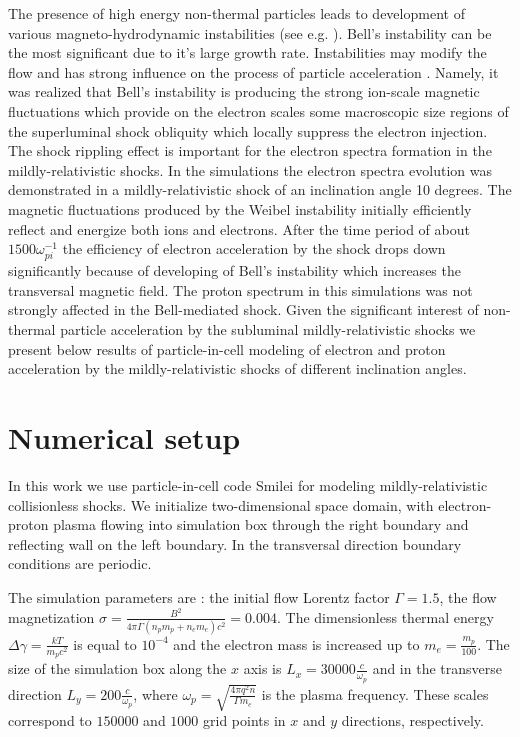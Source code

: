 \documentclass[a4paper]{jpconf}
\begin{document}
	The presence of high energy non-thermal particles leads to development of various magneto-hydrodynamic instabilities (see e.g. \cite{MD2001,Amato09,Bykov2013}). Bell's instability \cite{Bell04} can be the most significant due to it's large growth rate. Instabilities may modify the flow and has strong influence on the process of particle acceleration \cite{Crumley2019,2021MNRAS.501.4837L,2021MNRAS.502.5065L}. Namely, it was realized that Bell's instability is producing the strong ion-scale magnetic fluctuations which 
	provide on the electron scales some macroscopic size regions of the superluminal shock obliquity which locally suppress the electron injection. The shock rippling effect is important for the electron spectra formation in the mildly-relativistic shocks.
	In the simulations \cite{Crumley2019} the electron spectra evolution was demonstrated in a mildly-relativistic shock   of an inclination angle 10 degrees. The magnetic fluctuations produced by the Weibel instability initially efficiently reflect and energize both ions and electrons. After the time period of about $1500 \omega_{pi}^{-1}$  the efficiency of electron acceleration by the shock drops down significantly because of developing of Bell's instability which increases the transversal magnetic field. The proton spectrum in this simulations was not strongly affected in the Bell-mediated shock.   Given the significant interest of non-thermal particle acceleration by the subluminal mildly-relativistic shocks we present below results of particle-in-cell modeling of electron and proton acceleration by the mildly-relativistic shocks of different inclination angles. 
	
	
	\section{Numerical setup}
	In this work we use particle-in-cell code Smilei \cite{Smilei18} for modeling mildly-relativistic collisionless shocks. We initialize two-dimensional space domain, with electron-proton plasma flowing into simulation box through the right boundary and reflecting wall on the left boundary. In the transversal direction boundary conditions are periodic.
	
	The simulation parameters are : the initial flow Lorentz factor $\Gamma = 1.5$, the flow magnetization $\sigma = \frac{B^2}{4\pi\Gamma (n_p m_p + n_e m_e) c^2} = 0.004$. The dimensionless thermal energy $\Delta \gamma = \frac{k T}{m_p c^2}$ is equal to $10^{-4}$ and the electron mass is increased up to $m_e = \frac{m_p}{100}$. The size of the simulation box along the $x$ axis is $L_x = 30000\frac{c}{\omega_p}$ and in the transverse direction $L_y = 200\frac{c}{\omega_p}$, where $\omega_p = \sqrt{\frac{4\pi q^2 n}{\Gamma m_e}}$ is the plasma frequency. These scales correspond to $150000$ and $1000$ grid points in $x$ and $y$ directions, respectively. 
	
\end{document}
